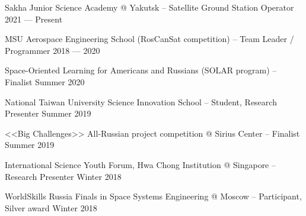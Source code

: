 Sakha Junior Science Academy @ Yakutsk -- Satellite Ground Station Operator \hfill 2021 --- Present

MSU Aerospace Engineering School (RosCanSat competition) -- Team Leader / Programmer	\hfill 2018 --- 2020
 
Space-Oriented Learning for Americans and Russians (SOLAR program) -- Finalist	\hfill Summer 2020

National Taiwan University Science Innovation School -- Student, Research Presenter	\hfill Summer 2019

<<Big Challenges>> All-Russian project competition @ Sirius Center -- Finalist	\hfill Summer 2019

International Science Youth Forum, Hwa Chong Institution @ Singapore -- Research Presenter	\hfill Winter 2018

WorldSkills Russia Finals in Space Systems Engineering @ Moscow -- Participant, Silver award	\hfill Winter 2018

